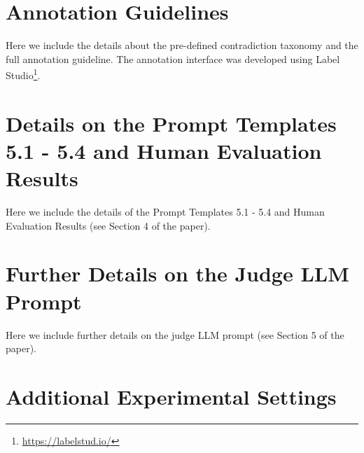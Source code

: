 \documentclass{article}
\begin{document}
\appendix


\section{Annotation Guidelines}

\label{appx:guidelines}

Here we include the details about the pre-defined contradiction taxonomy and the full annotation guideline. The annotation interface was developed using Label Studio\footnote{\url{https://labelstud.io/}}.




\section{Details on the Prompt Templates 5.1 - 5.4 and Human Evaluation Results}

\label{appx:details_prompt}

Here we include the details of the Prompt Templates 5.1 - 5.4 and Human Evaluation Results (see Section 4 of the paper).




\section{Further Details on the Judge LLM Prompt}

\label{appx:details_judge}

Here we include further details on the judge LLM prompt (see Section 5 of the paper).





\section{Additional Experimental Settings}
\end{document}
